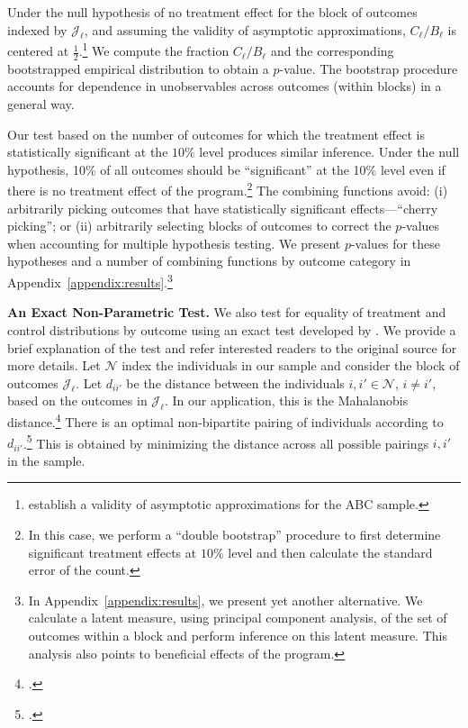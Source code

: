 Under the null hypothesis of no treatment effect for the block of outcomes indexed by $\mathcal{J}_\ell$, and assuming the validity of asymptotic approximations, $C_\ell / B_\ell$ is centered at $\frac{1}{2}$.\footnote{\citet{Campbell_Conti_etal_2014_EarlyChildhoodInvestments} establish a validity of asymptotic approximations for the ABC sample.} We compute the fraction $C_\ell / B_\ell$ and the corresponding bootstrapped empirical distribution to obtain a $p$-value. The bootstrap procedure accounts for dependence in unobservables across outcomes (within blocks) in a general way.

Our test based on the number of outcomes for which the treatment effect is statistically significant at the $10\%$ level produces similar inference. Under the null hypothesis, 10\% of all outcomes should be ``significant'' at the 10\% level even if there is no treatment effect of the program.\footnote{In this case, we perform a ``double bootstrap'' procedure to first determine significant treatment effects at $10\%$ level and then calculate the standard error of the count.} The combining functions avoid: (i) arbitrarily picking outcomes that have statistically significant effects---``cherry picking''; or (ii) arbitrarily selecting blocks of outcomes to correct the $p$-values when accounting for multiple hypothesis testing. We present $p$-values for these hypotheses and a number of combining functions by outcome category in Appendix~\ref{appendix:results}.\footnote{In Appendix~\ref{appendix:results}, we present yet another alternative. We calculate a latent measure, using principal component analysis, of the set of outcomes within a block and perform inference on this latent measure. This analysis also points to beneficial effects of the program.}

\textbf{An Exact Non-Parametric Test.} We also test for equality of treatment and control distributions by outcome using an exact test developed by \citet{Rosenbaum_2005_Distribution_JRSS}. We provide a brief explanation of the test and refer interested readers to the original source for more details. Let $\mathcal{N}$ index the individuals in our sample and consider the block of outcomes $\mathcal{J}_\ell$. Let $d_{ii'}$ be the distance between the individuals $i, i' \in \mathcal{N}$, $i \neq i'$, based on the outcomes in $\mathcal{J}_\ell$. In our application, this is the Mahalanobis distance.\footnote{\citet{Mahalanobis_1936_PNISI}.} There is an optimal non-bipartite pairing of individuals according to $d_{ii'}$.\footnote{\citet{Derigs_1988_Solving_AOR}.} This is obtained by minimizing the distance across all possible pairings $i, i'$ in the sample.

